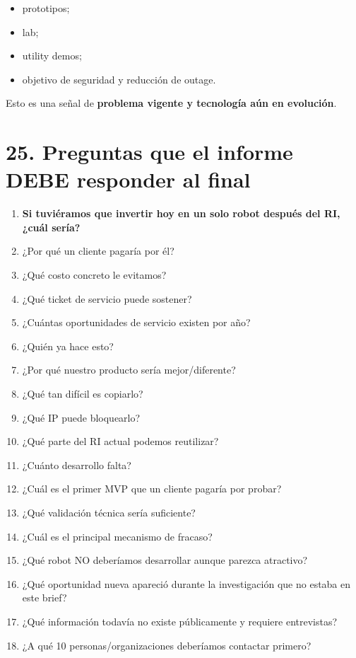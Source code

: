 \documentclass[11pt,a4paper]{article}
\begin{document}
\begin{itemize}
\item prototipos;
\item lab;
\item utility demos;
\item objetivo de seguridad y reducción de outage.
\end{itemize}

Esto es una señal de \textbf{problema vigente y tecnología aún en evolución}.


\section*{25. Preguntas que el informe DEBE responder al final}
\begin{enumerate}
\item \textbf{Si tuviéramos que invertir hoy en un solo robot después del RI, ¿cuál sería?}
\item ¿Por qué un cliente pagaría por él?
\item ¿Qué costo concreto le evitamos?
\item ¿Qué ticket de servicio puede sostener?
\item ¿Cuántas oportunidades de servicio existen por año?
\item ¿Quién ya hace esto?
\item ¿Por qué nuestro producto sería mejor/diferente?
\item ¿Qué tan difícil es copiarlo?
\item ¿Qué IP puede bloquearlo?
\item ¿Qué parte del RI actual podemos reutilizar?
\item ¿Cuánto desarrollo falta?
\item ¿Cuál es el primer MVP que un cliente pagaría por probar?
\item ¿Qué validación técnica sería suficiente?
\item ¿Cuál es el principal mecanismo de fracaso?
\item ¿Qué robot NO deberíamos desarrollar aunque parezca atractivo?
\item ¿Qué oportunidad nueva apareció durante la investigación que no estaba en este brief?
\item ¿Qué información todavía no existe públicamente y requiere entrevistas?
\item ¿A qué 10 personas/organizaciones deberíamos contactar primero?
\end{enumerate}
\end{document}
